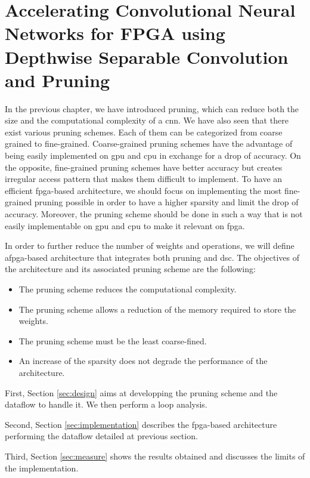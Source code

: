 \chapter{Accelerating Convolutional Neural Networks for FPGA using Depthwise Separable Convolution and Pruning} \label{chap:pratique}
%
%
In the previous chapter, we have introduced pruning, which can reduce both the size and the computational complexity of a \acrshort{cnn}. We have also seen that there exist various pruning schemes. Each of them can be categorized from coarse grained to fine-grained. Coarse-grained pruning schemes have the advantage of being easily implemented on \acrshort{gpu} and \acrshort{cpu} in exchange for a drop of accuracy. On the opposite, fine-grained pruning schemes have better accuracy but creates irregular access pattern that makes them difficult to implement. To have an efficient \acrshort{fpga}-based architecture, we should focus on implementing the most fine-grained pruning possible in order to have a higher sparsity and limit the drop of accuracy. Moreover, the pruning scheme should be done in such a way that is not easily implementable on \acrshort{gpu} and \acrshort{cpu} to make it relevant on \acrshort{fpga}.

In order to further reduce the number of weights and operations, we will define a\acrshort{fpga}-based architecture that integrates both pruning and \acrshort{dsc}. The objectives of the architecture and its associated pruning scheme are the following:
%
\begin{itemize}
    \item The pruning scheme reduces the computational complexity.
    \item The pruning scheme allows a reduction of the memory required to store the weights.
    \item The pruning scheme must be the least coarse-fined.
    \item An increase of the sparsity does not degrade the performance of the architecture.
\end{itemize}
%
First, Section \ref{sec:design} aims at developping the pruning scheme and the dataflow to handle it. We then perform a loop analysis.

Second, Section \ref{sec:implementation} describes the \acrshort{fpga}-based architecture performing the dataflow detailed at previous section.

Third, Section \ref{sec:measure} shows the results obtained and discusses the limits of the implementation.
%
%

%
%

%
%

%
%
\afterpage{\blankpage}
\cleardoublepage
\newpage
